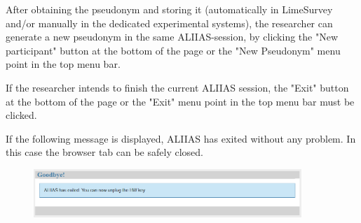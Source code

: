 After obtaining the pseudonym and storing it (automatically in LimeSurvey and/or manually in the dedicated experimental systems), the researcher can generate a new pseudonym in the same ALIIAS-session, by clicking the "New participant" button at the bottom of the page or the "New Pseudonym" menu point in the top menu bar.

If the researcher intends to finish the current ALIIAS session, the "Exit" button at the bottom of the page or the "Exit" menu point in the top menu bar must be clicked.

If the following message is displayed, ALIIAS has exited without any problem. In this case the browser tab can be safely closed.

\begin{figure}[H]
\includegraphics[width=0.9\textwidth]{docs/fig/08_exit.PNG}
\end{figure}

\small\setlength\fboxsep{5pt}\setlength\fboxrule{1pt}
\large
